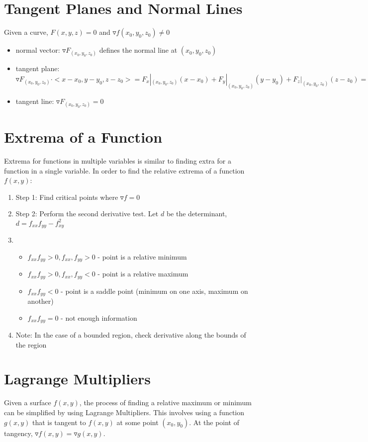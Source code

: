 \documentclass [12 pt, oneside] {book}
\begin{document}
\section{Tangent Planes and Normal Lines}
Given a curve, $F(x,y,z)=0$ and $\triangledown f(x_0,y_0,z_0) \neq 0$
\begin{itemize}
\item normal vector: $\triangledown F_{(x_0,y_0,z_0)}$ defines the normal line at $(x_0,y_0,z_0)$
\item tangent plane: $\triangledown F_{(x_0,y_0,z_0)}\cdot <x-x_0,y-y_0,z-z_0> = F_x|_{(x_0,y_0,z_0)}(x-x_0)+F_y|_{(x_0,y_0,z_0)}(y-y_0)+F_z|_{(x_0,y_0,z_0)}(z-z_0)=0$
\item tangent line: $\triangledown F_{(x_0,y_0,z_0)}=0$
\end{itemize}

\section{Extrema of a Function}
Extrema for functions in multiple variables is similar to finding extra for a function in a single variable.
In order to find the relative extrema of a function $f(x,y)$:
\begin{enumerate}
\item Step 1: Find critical points where $\triangledown f = 0$
\item Step 2: Perform the second derivative test. Let $d$ be the determinant, $d=f_{xx}f_{yy}-f_{xy}^2$
\item\begin{itemize}
	\item $f_{xx}f_{yy} > 0, f_{xx}, f_{yy} > 0 $ - point is a relative minimum
	\item $f_{xx}f_{yy} > 0, f_{xx}, f_{yy} < 0 $ - point is a relative maximum
	\item $f_{xx}f_{yy} < 0 $ - point is a saddle point (minimum on one axis, maximum on another)
	\item $f_{xx}f_{yy} = 0 $ - not enough information
\end{itemize}
\item Note: In the case of a bounded region, check derivative along the bounds of the region
\end{enumerate}
\section{Lagrange Multipliers}
Given a surface $f(x,y)$, the process of finding a relative maximum or minimum can be simplified by using Lagrange Multipliers. This involves using a function $g(x,y)$ that is tangent to $f(x,y)$ at some point $(x_0,y_0)$. At the point of tangency, $\triangledown f(x,y) = \triangledown g(x,y)$.
\end{document}
